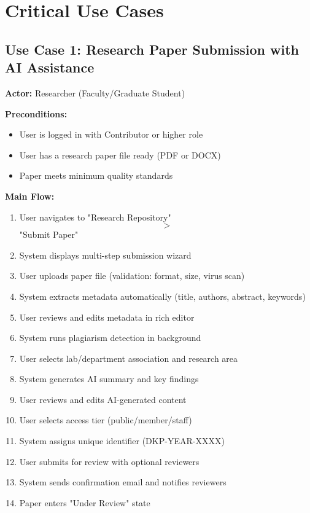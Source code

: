 \documentclass[12pt,a4paper]{report}
\begin{document}
\section{Critical Use Cases}

\subsection{Use Case 1: Research Paper Submission with AI Assistance}

\textbf{Actor:} Researcher (Faculty/Graduate Student)

\textbf{Preconditions:}
\begin{itemize}
    \item User is logged in with Contributor or higher role
    \item User has a research paper file ready (PDF or DOCX)
    \item Paper meets minimum quality standards
\end{itemize}

\textbf{Main Flow:}
\begin{enumerate}
    \item User navigates to "Research Repository" $$>$$ "Submit Paper"
    \item System displays multi-step submission wizard
    \item User uploads paper file (validation: format, size, virus scan)
    \item System extracts metadata automatically (title, authors, abstract, keywords)
    \item User reviews and edits metadata in rich editor
    \item System runs plagiarism detection in background
    \item User selects lab/department association and research area
    \item System generates AI summary and key findings
    \item User reviews and edits AI-generated content
    \item User selects access tier (public/member/staff)
    \item System assigns unique identifier (DKP-YEAR-XXXX)
    \item User submits for review with optional reviewers
    \item System sends confirmation email and notifies reviewers
    \item Paper enters "Under Review" state
\end{enumerate}
\end{document}
